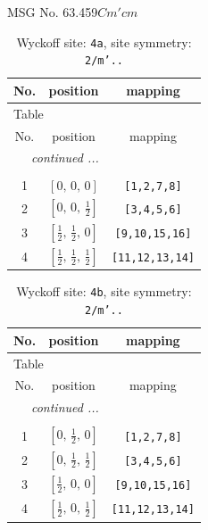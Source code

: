 \documentclass[fleqn,8pt]{jsarticle}
\begin{document}
\setcounter{MaxMatrixCols}{32}

\renewcommand{\tablename}{Table~}
\renewcommand{\figurename}{Figure~}
\begin{center}
\LARGE
MSG No. 63.459\quad$Cm'cm$
\end{center}
\renewcommand{\arraystretch}{1.2}
\begin{longtable}{ccc}
\caption{Wyckoff site: {\tt 4a}, site symmetry: {\tt 2/m'..}}
 \\
 \hline \hline
No. & position & mapping \\ \hline \endfirsthead

\multicolumn{2}{l}{\tablename\ \thetable{}} \\
 \hline \hline
No. & position & mapping \\ \hline \endhead

 \hline \hline
\multicolumn{2}{r}{\footnotesize\it continued ...} \\ \endfoot

 \hline \hline
\multicolumn{2}{r}{} \\ \endlastfoot

1 & $\left[ 0,\, 0,\, 0 \right]$ & {\tt [1,2,7,8]} \\ \hline
2 & $\left[ 0,\, 0,\, \frac{1}{2} \right]$ & {\tt [3,4,5,6]} \\ \hline
3 & $\left[ \frac{1}{2},\, \frac{1}{2},\, 0 \right]$ & {\tt [9,10,15,16]} \\ \hline
4 & $\left[ \frac{1}{2},\, \frac{1}{2},\, \frac{1}{2} \right]$ & {\tt [11,12,13,14]} \\
\end{longtable}
\renewcommand{\arraystretch}{1.2}
\begin{longtable}{ccc}
\caption{Wyckoff site: {\tt 4b}, site symmetry: {\tt 2/m'..}}
 \\
 \hline \hline
No. & position & mapping \\ \hline \endfirsthead

\multicolumn{2}{l}{\tablename\ \thetable{}} \\
 \hline \hline
No. & position & mapping \\ \hline \endhead

 \hline \hline
\multicolumn{2}{r}{\footnotesize\it continued ...} \\ \endfoot

 \hline \hline
\multicolumn{2}{r}{} \\ \endlastfoot

1 & $\left[ 0,\, \frac{1}{2},\, 0 \right]$ & {\tt [1,2,7,8]} \\ \hline
2 & $\left[ 0,\, \frac{1}{2},\, \frac{1}{2} \right]$ & {\tt [3,4,5,6]} \\ \hline
3 & $\left[ \frac{1}{2},\, 0,\, 0 \right]$ & {\tt [9,10,15,16]} \\ \hline
4 & $\left[ \frac{1}{2},\, 0,\, \frac{1}{2} \right]$ & {\tt [11,12,13,14]} \\
\end{longtable}
\end{document}
